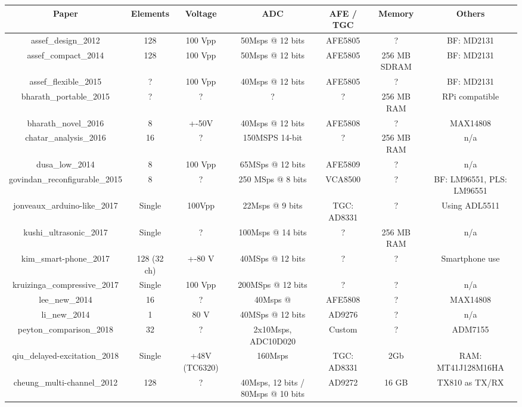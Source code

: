 

\begin{center}
 \begin{tabular}{||c | c c c c c | c ||} 
 \hline
 Paper 			& Elements 	& Voltage 	& ADC 			& AFE / TGC 	& Memory 	& Others\\ [0.5ex] 
 \hline\hline	
 assef_design_2012	& 128		& 100 Vpp 	& 50Msps @ 12 bits	& AFE5805	& ? 		& BF: MD2131 \\ 
 \hline
 assef_compact_2014	& 128		& 100 Vpp  	& 50Msps @ 12 bits	& AFE5805	& 256 MB SDRAM  & BF: MD2131 \\ 
 \hline
 assef_flexible_2015	& ? 		& 100 Vpp 	& 40Msps @ 12 bits 	& AFE5805	&  ?		& BF: MD2131 \\ 
 \hline
 bharath_portable_2015	& ?	 	& ?	 	& ?			& ?		& 256 MB RAM	& RPi compatible\\ 
 \hline
 bharath_novel_2016	& 8	 	& +-50V	 	& 40Msps @ 12 bits	& AFE5808	& ? 		& MAX14808 \\ 
 \hline
 chatar_analysis_2016	& 16	 	& ?	 	& 150MSPS 14-bit	& ?		& 256 MB RAM	& n/a \\ 
 \hline
 dusa_low_2014		& 8 		& 100 Vpp 	& 65MSps @ 12 bits 	& AFE5809	& ? 		& n/a \\ 
 \hline
 govindan_reconfigurable_2015	& 8	 & ?	 	& 250 MSps @ 8 bits	& VCA8500	& ? 		& BF: LM96551, PLS: LM96551\\ 
 \hline
 jonveaux_arduino-like_2017	& Single & 100Vpp 	& 22Msps @ 9 bits	& TGC: AD8331	& ? 		& Using ADL5511 \\ 
 \hline
kushi_ultrasonic_2017	& Single	& ?		& 100Msps @ 14 bits 	& ?		& 256 MB RAM	& n/a \\
 \hline
 kim_smart-phone_2017	& 128 (32 ch)	& +-80 V 	& 40MSps @ 12 bits 	& ?		& ? 		& Smartphone use\\ 
 \hline
 kruizinga_compressive_2017 & Single 	& 100 Vpp 	& 200MSps @ 12 bits 	& ?		& ?		& n/a \\
 \hline
 lee_new_2014		& 16 		& ?		& 40Msps @		& AFE5808	& ? 		& MAX14808\\ 
 \hline
 li_new_2014		& 1	 	& 80 V	 	& 40MSps @ 12 bits 	& AD9276	& ?		& n/a \\
 \hline
 peyton_comparison_2018	& 32	 	& ?	 	& 2x10Msps, ADC10D020	& Custom	& ? 		& ADM7155\\ 
 \hline
 qiu_delayed-excitation_2018 	& Single  & +48V (TC6320) & 160Msps		& TGC: AD8331	& 2Gb		& RAM: MT41J128M16HA \\ 
 \hline
 cheung_multi-channel_2012 & 	128 	& ?		& 40Msps, 12 bits / 80Msps @ 10 bits & AD9272 & 16 GB 	& TX810 as TX/RX	

\end{tabular}
\end{center}
